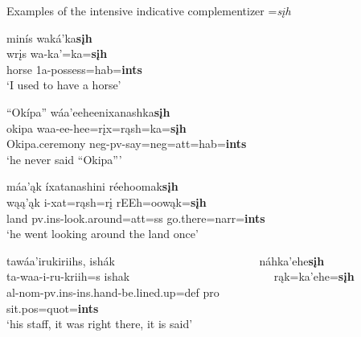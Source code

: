 \begin{exe}

\item\label{intensivecomplementizerexamples} Examples of the intensive indicative complementizer =\textit{sįh}

	\begin{xlist}
	
	\item\label{intensivecomplementizerexamples1}
	\glll minís waká'ka\textbf{sįh}\\
	wrįs wa-ka'=ka=\textbf{sįh}\\
	\textnormal{horse} 1a-\textnormal{possess}=hab=\textbf{ints}\\
	\glt `I used to have a horse' \citep[27]{mixco1997a}
	
	\item\label{intensivecomplementizerexamples2}
	\glll ``Okípa'' wáa'eeheenixanashka\textbf{sįh}\\
	okipa waa-ee-hee=rįx=rąsh=ka=\textbf{sįh}\\
	\textnormal{Okipa.ceremony} neg-pv-\textnormal{say}=neg=att=hab=\textbf{ints}\\
	\glt `he never said ``Okipa''' \citep[29]{mixco1997a}

	\item\label{intensivecomplementizerexamples3}
	\glll máa'ąk íxatanashini réehoomak\textbf{sįh}\\
	wąą'ąk i-xat=rąsh=rį rEEh=oowąk=\textbf{sįh}\\
	\textnormal{land} pv.ins-\textnormal{look.around}=att=ss \textnormal{go.there}=narr=\textbf{ints}\\
	\glt `he went looking around the land once' \citep[6]{hollow1973a}

	\item\label{intensivecomplementizerexamples4}
	\glll tawáa'irukiriihs, ishák ~ ~ ~ ~ ~ ~ ~ ~ ~ ~ ~ ~ ~ ~ ~  náhka'ehe\textbf{sįh}\\
	ta-waa-i-ru-kriih=s ishak ~ ~ ~ ~ ~ ~ ~ ~ ~ ~ ~ ~ ~ ~ ~  rąk=ka'ehe=\textbf{sįh}\\
	al-{nom}-pv.ins-ins.hand-\textnormal{be.lined.up}=def pro ~ ~ ~ ~ ~ ~ ~ ~ ~ ~ ~ ~ ~ ~ ~  sit.pos=quot=\textbf{ints}\\
	\glt `his staff, it was right there, it is said' \citep[7]{hollow1973a}

	\end{xlist}

\end{exe}

